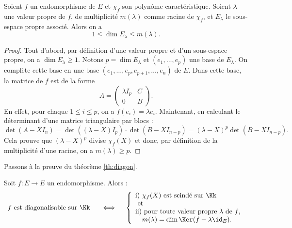 \documentclass[12pt, class=report,crop=false]{standalone}
\begin{document}
\begin{proposition*}
Soient $f$ un endomorphisme de $E$ et $\chi_f$ son polynôme caractéristique.
Soient $\lambda$ une valeur propre de $f$, de multiplicité $m(\lambda)$ comme racine de $\chi_f$, 
et $E_\lambda$ le sous-espace propre associé. Alors on a
$$1\leq \dim E_\lambda\leq m(\lambda).$$
\end{proposition*} 


\begin{proof}
Tout d'abord, par définition d'une valeur propre et d'un sous-espace propre, on a $\dim E_\lambda\geq 1$.
Notons $p=\dim E_\lambda$ et $(e_1,\dots,e_p)$ une base de $E_\lambda$.
 On complète cette base en une base 
$(e_1,\dots,e_p,e_{p+1},\dots,e_n)$ de $E$.
Dans cette base, la matrice de $f$ est de la forme
$$A=
\left(\begin{array}{c|c}
\lambda I_p & C \\ \hline 
 0 & B\end{array}\right).$$
En effet, pour chaque $1\le i \le p$, on a $f(e_i) = \lambda e_i$. 
Maintenant, en calculant le déterminant d'une matrice triangulaire par blocs :
$$\det(A-XI_n)=\det((\lambda-X)I_p) \cdot \det(B-XI_{n-p})=(\lambda-X)^p\det(B-XI_{n-p}).$$
Cela prouve que $(\lambda-X)^p$ divise $\chi_f(X)$ et donc, par définition 
de la multiplicité d'une racine, on a $m(\lambda) \ge p$. 
\end{proof} 



Passons à la preuve du théorème \ref{th:diagon}.

\begin{theoreme*}
Soit  $f :  E \to E$ un endomorphisme. Alors :
\[f \text{ est diagonalisable sur $\Kk$ } \quad\iff\quad \left\{\begin{array}{l}
\text{i) } \chi_f(X) \mbox{ est scindé sur $\Kk$}\\
\text{ et }\\
\text{ii) pour toute valeur propre $\lambda$ de $f$,} \\ \quad m(\lambda) = \dim \Ker(f-\lambda \id_E).
\end{array}\right.\]
\end{theoreme*}
\end{document}
